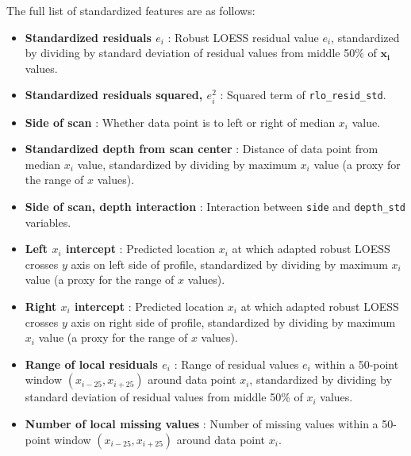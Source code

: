 \documentclass[12pt]{article}
\begin{document}
The full list of standardized features are as follows:

\begin{itemize}

\item[] \textbf{Standardized residuals $e_i$} {}: Robust LOESS residual value $e_i$, standardized by dividing by standard deviation of residual values from middle 50\% of $\mathbf{x_i}$ values.  

\item[] \textbf{Standardized residuals squared, $e_i^2$} {}: Squared term of \texttt{rlo\_resid\_std}.   

\item[] \textbf{Side of scan} {}: Whether data point is to left or right of median $x_i$ value.  

\item[] \textbf{Standardized depth from scan center} {}: Distance of data point from median $x_i$ value, standardized by dividing by maximum $x_i$ value (a proxy for the range of $x$ values).  

\item[] \textbf{Side of scan, depth interaction} {}: Interaction between \texttt{side} and \texttt{depth\_std} variables.  

\item[] \textbf{Left $x_i$ intercept} {}: Predicted location $x_i$ at which adapted robust LOESS crosses $y$ axis on left side of profile, standardized by dividing by maximum $x_i$ value (a proxy for the range of $x$ values).  

\item[] \textbf{Right $x_i$ intercept} {}: Predicted location $x_i$ at which adapted robust LOESS crosses $y$ axis on right side of profile, standardized by dividing by maximum $x_i$ value (a proxy for the range of $x$ values).  

\item[] \textbf{Range of local residuals $e_i$} {}: Range of residual values $e_i$ within a 50-point window $(x_{i-25}, x_{i+25})$ around data point $x_i$, standardized by dividing by standard deviation of residual values from middle 50\% of $x_i$ values.  

\item[] \textbf{Number of local missing values} {}: Number of missing values within a 50-point window $(x_{i-25}, x_{i+25})$ around data point $x_i$.  


\end{itemize}
\end{document}
